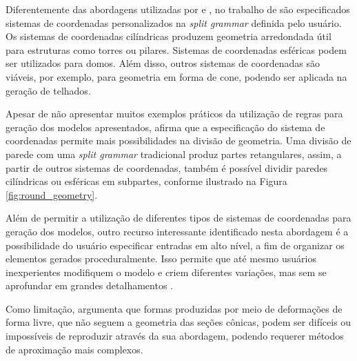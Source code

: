 Diferentemente das abordagens utilizadas por  e , no trabalho de  são especificados sistemas de coordenadas personalizados na \textit{split grammar} definida pelo usuário. Os sistemas de coordenadas cilíndricas produzem geometria arredondada útil para estruturas como torres ou pilares. Sistemas de coordenadas esféricas podem ser utilizados para domos. Além disso, outros sistemas de coordenadas são viáveis, por exemplo, para geometria em forma de cone, podendo ser aplicada na geração de telhados.

Apesar de não apresentar muitos exemplos práticos da utilização de regras para geração dos modelos apresentados,  afirma que a especificação do sistema de coordenadas permite mais possibilidades na divisão de geometria. Uma divisão de parede com uma \textit{split grammar} tradicional produz partes retangulares, assim, a partir de outros sistemas de coordenadas, também é possível dividir paredes cilíndricas ou esféricas em subpartes, conforme ilustrado na Figura \ref{fig:round_geometry}.

\begin{figure}[h!]
	\centering
	\captionsetup{width=15cm}
	{}	
\end{figure}

Além de permitir a utilização de diferentes tipos de sistemas de coordenadas para geração dos modelos, outro recurso interessante identificado nesta abordagem é a possibilidade do usuário especificar entradas em alto nível, a fim de organizar os elementos gerados proceduralmente. Isso permite que até mesmo usuários inexperientes modifiquem o modelo e criem diferentes variações, mas sem se aprofundar em grandes detalhamentos \cite{edelsbrunner2017}.

Como limitação,  argumenta que formas produzidas por meio de deformações de forma livre, que não seguem a geometria das seções cônicas, podem ser difíceis ou impossíveis de reproduzir através da sua abordagem, podendo requerer métodos de aproximação mais complexos.